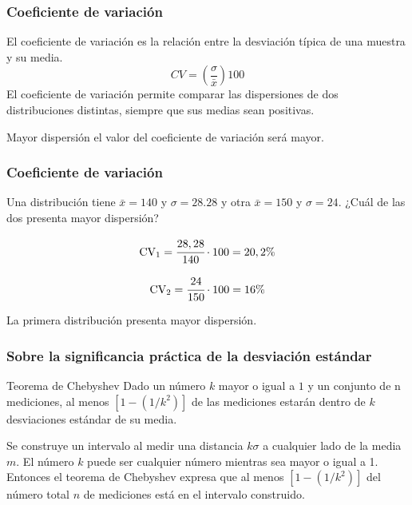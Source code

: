 \documentclass[spanish]{beamer}
\begin{document}
\begin{frame}
\frametitle{Coeficiente de variación}
El coeficiente de variación es la relación entre la desviación típica de una muestra y su media.
\begin{equation*}
CV=\left( \frac{\sigma}{\bar{x}} \right) 100
\end{equation*}
El coeficiente de variación permite comparar las dispersiones de dos distribuciones distintas, siempre que sus medias sean positivas.

Mayor dispersión el valor del coeficiente de variación será mayor.
\end{frame}
\begin{frame}
\frametitle{Coeficiente de variación}
Una distribución tiene $\bar{x}=140$ y $\sigma =28.28$ y otra $\bar{x}=150$ y $\sigma =24$. ¿Cuál de las dos presenta mayor dispersión?

\begin{equation*}
\textup{CV}_{1}=\cfrac{28,28}{140}\cdot 100=20,2 \%
\end{equation*}
 
\begin{equation*}
\textup{CV}_{2}=\cfrac{24}{150}\cdot 100=16 \%
\end{equation*}
 
La primera distribución presenta mayor dispersión.

\end{frame}
\begin{frame}
\frametitle{Sobre la significancia práctica de la desviación estándar}

\begin{block}{Teorema de Chebyshev}
Dado un número $k$ mayor o igual a $1$ y un conjunto de n mediciones, al menos $[1 - (1/k^2)]$ de las mediciones estarán dentro de $k$ desviaciones estándar de su media.
\end{block}

Se construye un intervalo al medir una distancia $k\sigma$ a cualquier lado de la media $m$. El número $k$ puede ser cualquier número mientras sea mayor o igual a 1. Entonces el teorema de Chebyshev expresa que al menos $[1 - (1/k^2)]$ del número total $n$ de mediciones está en el intervalo construido.

\end{frame}
\end{document}
